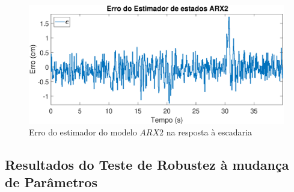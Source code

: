\begin{figure}[htb]
	\centering
	\includegraphics[width=1\linewidth]{erroarx2}
	\caption[Erro do estimador do modelo $ARX2$ na resposta à escadaria]{Erro do estimador do modelo $ARX2$ na resposta à escadaria}
	\label{fig:erroarx2}
\end{figure}


\subsection{Resultados do Teste de Robustez à mudança de Parâmetros}\label{rmp}

